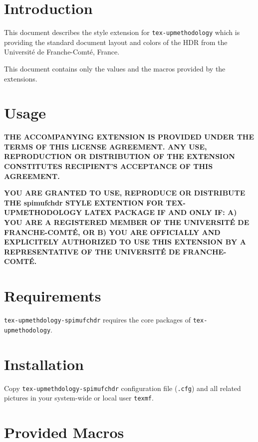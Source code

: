 \documentclass[article,english]{upmethodology-document}
\begin{document}
\section{Introduction}

This document describes the style extension for \texttt{tex-upmethodology} which is providing the standard document layout and colors of the HDR from the Universit\'e de Franche-Comt\'e, France.

This document contains only the values and the macros provided by the extensions.

\section{Usage}

\textbf{THE ACCOMPANYING EXTENSION IS PROVIDED UNDER THE TERMS OF THIS LICENSE AGREEMENT. ANY USE, REPRODUCTION OR DISTRIBUTION OF THE EXTENSION CONSTITUTES RECIPIENT'S ACCEPTANCE OF THIS AGREEMENT.}

\textbf{YOU ARE GRANTED TO USE, REPRODUCE OR DISTRIBUTE THE spimufchdr STYLE EXTENTION FOR TEX-UPMETHODOLOGY LATEX PACKAGE IF AND ONLY IF: A) YOU ARE A REGISTERED MEMBER OF THE UNIVERSIT\'E DE FRANCHE-COMT\'E, OR B) YOU ARE OFFICIALLY AND EXPLICITELY AUTHORIZED TO USE THIS EXTENSION BY A REPRESENTATIVE OF THE UNIVERSIT\'E DE FRANCHE-COMT\'E.}

\section{Requirements}

\texttt{tex-upmethdology-spimufchdr} requires the core packages of \texttt{tex-upmethodology}.

\section{Installation}

Copy \texttt{tex-upmethdology-spimufchdr} configuration file (\texttt{.cfg}) and all related pictures in your system-wide or local user \texttt{texmf}.

\section{Provided Macros}
\end{document}
